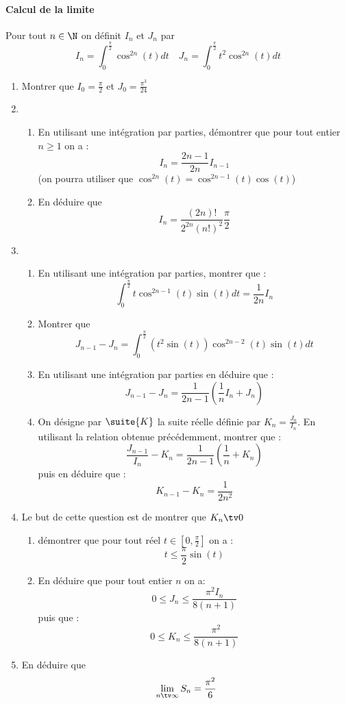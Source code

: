 \documentclass[a4paper, 11pt,reqno]{article}
\begin{document}
\paragraph{Calcul de la limite}
Pour tout $n\in \N$ on définit $I_n$ et $J_n$ par 
$$I_n = \int_0^{\frac{\pi}{2}} \cos^{2n}(t) dt \quad J_n=\int_0^{\frac{\pi}{2}} t^2 \cos^{2n}(t) dt$$
\begin{enumerate}
\item Montrer que $I_0= \frac{\pi}{2}$ et $J_0 = \frac{\pi^3}{24}$
\item \begin{enumerate}
\item En utilisant une intégration par parties, démontrer que pour tout entier $n\geq 1$ on a :
$$I_n =\frac{2n-1}{2n} I_{n-1}$$
(on pourra utiliser que $\cos^{2n}(t)=\cos^{2n-1}(t)\cos(t)$)
\item En déduire que 
$$I_n = \frac{(2n)! }{2^{2n} (n!)^2} \frac{\pi}{2}$$
\end{enumerate}
\item \begin{enumerate}
\item En utilisant une intégration par parties, montrer que : 
$$\int_0^{\frac{\pi}{2}} t \cos^{2n-1}(t)\sin(t) dt =\frac{1}{2n} I_n$$
\item Montrer que $$J_{n-1} -J_n = \int_0^{\frac{\pi}{2}}( t^2 \sin(t)) \cos^{2n-2}(t)\sin(t) dt$$
\item En utilisant une intégration par parties en déduire que :
$$J_{n-1} -J_n = \frac{1}{2n-1}\left( \frac{1}{n}I_n +J_n\right)$$
\item On désigne par $\suite{K}$ la suite réelle définie par $K_n = \frac{J_n}{I_n}$. 
En utilisant la relation obtenue précédemment, montrer que :
$$\frac{J_{n-1}}{I_n} -K_n = \frac{1}{2n-1}\left( \frac{1}{n} +K_n\right)$$
puis en déduire que :
$$K_{n-1} - K_n =\frac{1}{2n^2}$$
\end{enumerate}
\item Le but de cette question est de montrer que $K_n \tv 0$ 
\begin{enumerate}
\item démontrer que pour tout réel $t\in [0, \frac{\pi}{2}] $ on a :
$$t\leq \frac{\pi}{2 }\sin(t)$$
\item  En déduire que pour tout entier $n$ on  a: 
$$0\leq J_n \leq \frac{\pi^2 I_n}{8(n+1) }$$
puis que : 
$$0\leq K_n \leq \frac{\pi^2 }{8(n+1) }$$
\end{enumerate}
\item En déduire que $$\lim_{n\tv \infty} S_n =\frac{\pi^2}{6}$$
\end{enumerate}
\end{document}
